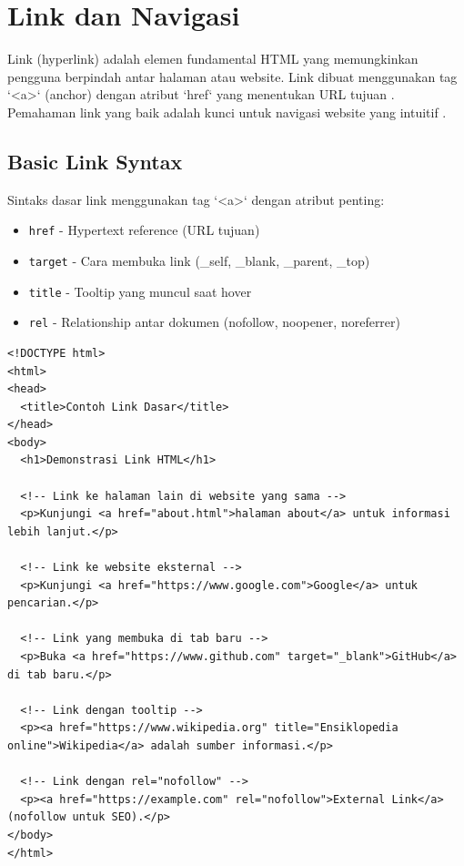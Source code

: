 \section{Link dan Navigasi}

Link (hyperlink) adalah elemen fundamental HTML yang memungkinkan pengguna berpindah antar halaman atau website. Link dibuat menggunakan tag `<a>` (anchor) dengan atribut `href` yang menentukan URL tujuan \cite{w3schools-html}. Pemahaman link yang baik adalah kunci untuk navigasi website yang intuitif \cite{mdn-html}.

\subsection{Basic Link Syntax}

Sintaks dasar link menggunakan tag `<a>` dengan atribut penting:

\begin{itemize}
  \item \texttt{href} - Hypertext reference (URL tujuan)
  \item \texttt{target} - Cara membuka link (\_self, \_blank, \_parent, \_top)
  \item \texttt{title} - Tooltip yang muncul saat hover
  \item \texttt{rel} - Relationship antar dokumen (nofollow, noopener, noreferrer)
\end{itemize}

\begin{lstlisting}[caption={Contoh Basic Link}, basicstyle=\ttfamily\small, frame=single]
<!DOCTYPE html>
<html>
<head>
  <title>Contoh Link Dasar</title>
</head>
<body>
  <h1>Demonstrasi Link HTML</h1>
  
  <!-- Link ke halaman lain di website yang sama -->
  <p>Kunjungi <a href="about.html">halaman about</a> untuk informasi lebih lanjut.</p>
  
  <!-- Link ke website eksternal -->
  <p>Kunjungi <a href="https://www.google.com">Google</a> untuk pencarian.</p>
  
  <!-- Link yang membuka di tab baru -->
  <p>Buka <a href="https://www.github.com" target="_blank">GitHub</a> di tab baru.</p>
  
  <!-- Link dengan tooltip -->
  <p><a href="https://www.wikipedia.org" title="Ensiklopedia online">Wikipedia</a> adalah sumber informasi.</p>
  
  <!-- Link dengan rel="nofollow" -->
  <p><a href="https://example.com" rel="nofollow">External Link</a> (nofollow untuk SEO).</p>
</body>
</html>
\end{lstlisting}


